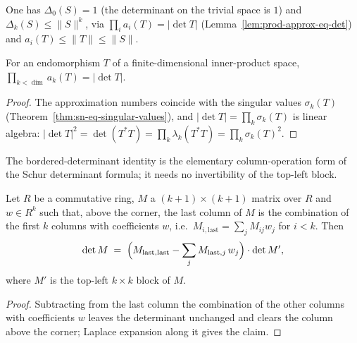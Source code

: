 One has $\Delta_0(S) = 1$ (the determinant on the trivial space is $1$) and
$\Delta_k(S) \le \|S\|^k$, via $\prod_i a_i(T) = |\det T|$
(Lemma~\ref{lem:prod-approx-eq-det}) and $a_i(T) \le \|T\| \le \|S\|$.

\begin{lemma}
\label{lem:prod-approx-eq-det}
\leanok
{}
For an endomorphism $T$ of a finite-dimensional inner-product space,
$\prod_{k < \dim} a_k(T) = |\det T|$.
\end{lemma}
\begin{proof}
\leanok
{}
The approximation numbers coincide with the singular values $\sigma_k(T)$
(Theorem~\ref{thm:sn-eq-singular-values}), and
$|\det T| = \prod_k \sigma_k(T)$ is linear algebra:
$|\det T|^2 = \det(T^* T) = \prod_k \lambda_k(T^* T) = \prod_k
\sigma_k(T)^2$.
\end{proof}

The bordered-determinant identity is the elementary column-operation form of
the Schur determinant formula; it needs no invertibility of the top-left block.

\begin{lemma}
\label{lem:det-bordered}
\leanok
Let $R$ be a commutative ring, $M$ a $(k+1) \times (k+1)$ matrix over $R$ and
$w \in R^k$ such that, above the corner, the last column of $M$ is the
combination of the first $k$ columns with coefficients $w$, i.e.\
$M_{i,\mathrm{last}} = \sum_j M_{ij} w_j$ for $i < k$. Then
\[
  \det M \;=\;
  \Bigl( M_{\mathrm{last},\mathrm{last}}
    - \sum_j M_{\mathrm{last},j}\, w_j \Bigr)
  \cdot \det M' ,
\]
where $M'$ is the top-left $k \times k$ block of $M$.
\end{lemma}
\begin{proof}
\leanok
Subtracting from the last column the combination of the other columns with
coefficients $w$ leaves the determinant unchanged and clears the column above
the corner; Laplace expansion along it gives the claim.
\end{proof}

